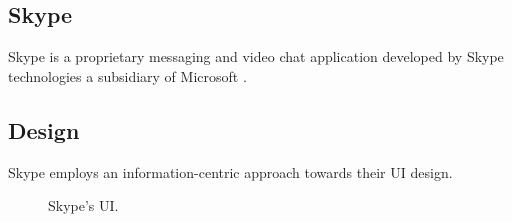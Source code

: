 \subsection{Skype}

Skype is a proprietary messaging and video chat application
developed by Skype technologies a subsidiary of Microsoft 
\cite{skype}.

\subsection*{Design}

Skype employs an information-centric approach towards their UI 
design.

\begin{figure}[H]

\centering
    \qquad
\centering

\caption{Skype's UI.}
\label{fig:Skype}
\end{figure}


